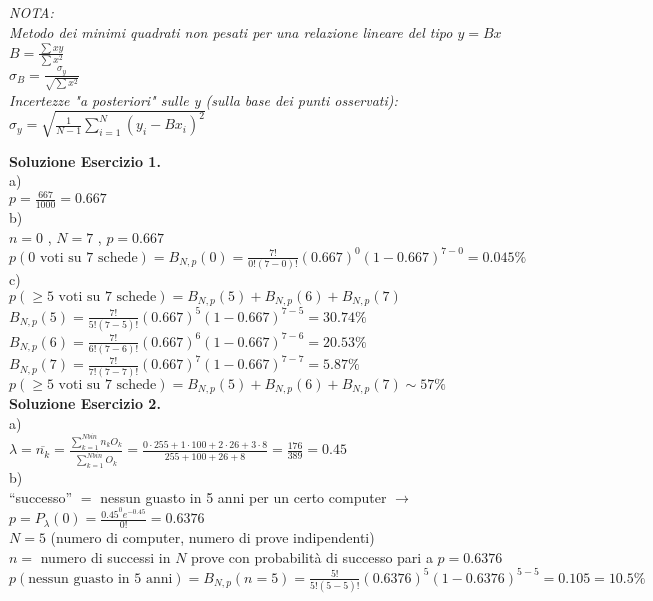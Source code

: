 \documentclass[10pt,a4paper,fleqn]{article}
\begin{document}
~\\~\\~\\~\\
{\it
NOTA:\\

Metodo dei minimi quadrati non pesati per una relazione lineare del tipo $y=Bx$\\
$B=\frac{\sum xy}{\sum x^2}$\\
$\sigma_B=\frac{\sigma_y}{\sqrt{\sum x^2}}$\\
Incertezze "a posteriori" sulle y (sulla base dei punti osservati):
$\sigma_y=\sqrt{\frac{1}{N-1} \sum_{i=1}^{N}(y_i-Bx_i)^2}$\\
}
\newpage

{\bf Soluzione Esercizio 1.}\\

a) \\
$p=\frac{667}{1000}=0.667$ \\

b) \\
$n=0$ , $N=7$ , $p=0.667$ \\
$p(\mbox{0 voti su 7 schede})=B_{N,p}(0)=\frac{7!}{0!(7-0)!}(0.667)^0
(1-0.667)^{7-0}=0.045\%$ \\

c) \\
$p(\ge \mbox{5 voti su 7 schede})=B_{N,p}(5) + B_{N,p}(6) + B_{N,p}(7)$ \\
$B_{N,p}(5)=\frac{7!}{5!(7-5)!}(0.667)^5
(1-0.667)^{7-5}=30.74\%$\\
$B_{N,p}(6)=\frac{7!}{6!(7-6)!}(0.667)^6
(1-0.667)^{7-6}=20.53\%$\\
$B_{N,p}(7)=\frac{7!}{7!(7-7)!}(0.667)^7
(1-0.667)^{7-7}=5.87\%$\\
$p(\ge \mbox{5 voti su 7 schede})=B_{N,p}(5) + B_{N,p}(6) +
B_{N,p}(7)\sim 57\%$ \\


{\bf Soluzione Esercizio 2.}\\

a) \\
$\lambda=\overline{n_k}=\frac{\sum_{k=1}^{Nbin} n_k O_k }{\sum_{k=1}^{Nbin} O_k } =
\frac{0\cdot 255 + 1 \cdot 100 + 2 \cdot 26 + 3 \cdot 8}{255+100+26+8}
= \frac{176}{389}=0.45$\\

b) \\
``successo'' $=$ nessun guasto in 5 anni per un certo computer $\rightarrow$ $p=P_{\lambda}(0)=\frac{0.45^{0} e^{-0.45}}{0!}=0.6376$\\
$N=5$ (numero di computer, numero di prove indipendenti)\\
$n = $ numero di successi in $N$ prove con probabilit\`a di successo pari a $p=0.6376$\\
$p(\mbox{nessun guasto in 5 anni})=B_{N,p}(n=5)=\frac{5!}{5!(5-5)!}(0.6376)^5 (1-0.6376)^{5-5}=0.105=10.5\%$\\
\end{document}
